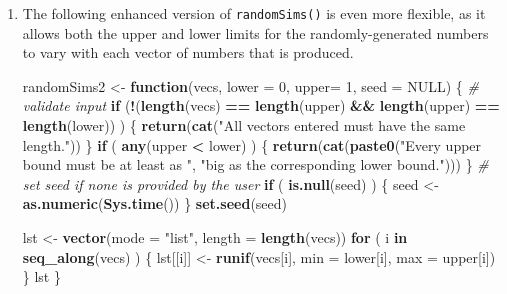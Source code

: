\documentclass[]{book}
\makeatletter
\newenvironment{Shaded}{\begin{snugshade}}{\end{snugshade}}
\newcommand{\KeywordTok}[1]{\textcolor[rgb]{0.13,0.29,0.53}{\textbf{#1}}}
\newcommand{\DataTypeTok}[1]{\textcolor[rgb]{0.13,0.29,0.53}{#1}}
\newcommand{\DecValTok}[1]{\textcolor[rgb]{0.00,0.00,0.81}{#1}}
\newcommand{\StringTok}[1]{\textcolor[rgb]{0.31,0.60,0.02}{#1}}
\newcommand{\CommentTok}[1]{\textcolor[rgb]{0.56,0.35,0.01}{\textit{#1}}}
\newcommand{\OtherTok}[1]{\textcolor[rgb]{0.56,0.35,0.01}{#1}}
\newcommand{\ControlFlowTok}[1]{\textcolor[rgb]{0.13,0.29,0.53}{\textbf{#1}}}
\newcommand{\OperatorTok}[1]{\textcolor[rgb]{0.81,0.36,0.00}{\textbf{#1}}}
\newcommand{\NormalTok}[1]{#1}
\newenvironment{kframe}{%
\medskip{}
\setlength{\fboxsep}{.8em}
 \def\at@end@of@kframe{}%
 \ifinner\ifhmode%
  \def\at@end@of@kframe{\end{minipage}}%
  \begin{minipage}{\columnwidth}%
 \fi\fi%
 \def\FrameCommand##1{\hskip\@totalleftmargin \hskip-\fboxsep
 \colorbox{shadecolor}{##1}\hskip-\fboxsep
     \hskip-\linewidth \hskip-\@totalleftmargin \hskip\columnwidth}%
 \MakeFramed {\advance\hsize-\width
   \@totalleftmargin\z@ \linewidth\hsize
   \@setminipage}}%
 {\par\unskip\endMakeFramed%
 \at@end@of@kframe}
\renewenvironment{Shaded}{\begin{kframe}}{\end{kframe}}
\theoremstyle{definition}
\theoremstyle{definition}
\theoremstyle{definition}
\theoremstyle{remark}
\makeatother
\begin{document}
{\begin{enumerate}
  Refactor the code for \texttt{randomSims()} so that it uses
  \texttt{lapply()} instead of a loop.
\item
  The following enhanced version of \texttt{randomSims()} is even more
  flexible, as it allows both the upper and lower limits for the
  randomly-generated numbers to vary with each vector of numbers that is
  produced.

\begin{Shaded}
\begin{Highlighting}[]
\NormalTok{randomSims2 <-}\StringTok{ }\ControlFlowTok{function}\NormalTok{(vecs, }\DataTypeTok{lower =} \DecValTok{0}\NormalTok{, }\DataTypeTok{upper=} \DecValTok{1}\NormalTok{, }\DataTypeTok{seed =} \OtherTok{NULL}\NormalTok{) \{}
  \CommentTok{# validate input}
  \ControlFlowTok{if}\NormalTok{ (}\OperatorTok{!}\NormalTok{(}\KeywordTok{length}\NormalTok{(vecs) }\OperatorTok{==}\StringTok{ }\KeywordTok{length}\NormalTok{(upper) }\OperatorTok{&&}\StringTok{ }\KeywordTok{length}\NormalTok{(upper) }\OperatorTok{==}\StringTok{ }\KeywordTok{length}\NormalTok{(lower)) ) \{}
    \KeywordTok{return}\NormalTok{(}\KeywordTok{cat}\NormalTok{(}\StringTok{"All vectors entered must have the same length."}\NormalTok{))}
\NormalTok{  \}}
  \ControlFlowTok{if}\NormalTok{ ( }\KeywordTok{any}\NormalTok{(upper }\OperatorTok{<}\StringTok{ }\NormalTok{lower) ) \{}
    \KeywordTok{return}\NormalTok{(}\KeywordTok{cat}\NormalTok{(}\KeywordTok{paste0}\NormalTok{(}\StringTok{"Every upper bound must be at least as "}\NormalTok{,}
                      \StringTok{"big as the corresponding lower bound."}\NormalTok{)))}
\NormalTok{  \}}
  \CommentTok{# set seed if none is provided by the user}
  \ControlFlowTok{if}\NormalTok{ ( }\KeywordTok{is.null}\NormalTok{(seed) ) \{}
\NormalTok{    seed <-}\StringTok{ }\KeywordTok{as.numeric}\NormalTok{(}\KeywordTok{Sys.time}\NormalTok{())}
\NormalTok{  \}}
  \KeywordTok{set.seed}\NormalTok{(seed)}

\NormalTok{  lst <-}\StringTok{ }\KeywordTok{vector}\NormalTok{(}\DataTypeTok{mode =} \StringTok{"list"}\NormalTok{, }\DataTypeTok{length =} \KeywordTok{length}\NormalTok{(vecs))}
  \ControlFlowTok{for}\NormalTok{ ( i }\ControlFlowTok{in} \KeywordTok{seq_along}\NormalTok{(vecs) ) \{}
\NormalTok{    lst[[i]] <-}\StringTok{ }\KeywordTok{runif}\NormalTok{(vecs[i], }\DataTypeTok{min =}\NormalTok{ lower[i], }\DataTypeTok{max =}\NormalTok{ upper[i])}
\NormalTok{  \}}
\NormalTok{  lst}
\NormalTok{\}}
\end{Highlighting}
\end{Shaded}


\end{enumerate}}
\end{document}
